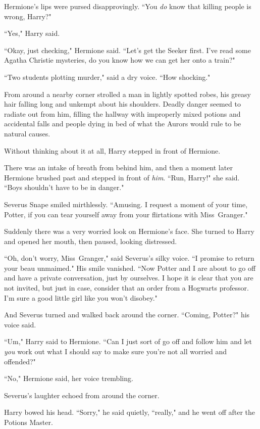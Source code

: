 Hermione's lips were pursed disapprovingly. ``You \emph{do} know that killing people is wrong, Harry?"

``Yes," Harry said.

``Okay, just checking," Hermione said. ``Let's get the Seeker first. I've read some Agatha Christie mysteries, do you know how we can get her onto a train?"

``Two students plotting murder," said a dry voice. ``How shocking."

From around a nearby corner strolled a man in lightly spotted robes, his greasy hair falling long and unkempt about his shoulders. Deadly danger seemed to radiate out from him, filling the hallway with improperly mixed potions and accidental falls and people dying in bed of what the Aurors would rule to be natural causes.

Without thinking about it at all, Harry stepped in front of Hermione.

There was an intake of breath from behind him, and then a moment later Hermione brushed past and stepped in front of \emph{him}. ``Run, Harry!" she said. ``Boys shouldn't have to be in danger."

Severus Snape smiled mirthlessly. ``Amusing. I request a moment of your time, Potter, if you can tear yourself away from your flirtations with Miss~Granger."

Suddenly there was a very worried look on Hermione's face. She turned to Harry and opened her mouth, then paused, looking distressed.

``Oh, don't worry, Miss~Granger," said Severus's silky voice. ``I promise to return your beau unmaimed." His smile vanished. ``Now Potter and I are about to go off and have a private conversation, just by ourselves. I hope it is clear that you are not invited, but just in case, consider that an order from a Hogwarts professor. I'm sure a good little girl like you won't disobey."

And Severus turned and walked back around the corner. ``Coming, Potter?" his voice said.

``Um," Harry said to Hermione. ``Can I just sort of go off and follow him and let \emph{you} work out what I should say to make sure you're not all worried and offended?"

``No," Hermione said, her voice trembling.

Severus's laughter echoed from around the corner.

Harry bowed his head. ``Sorry," he said quietly, ``really," and he went off after the Potions Master.


